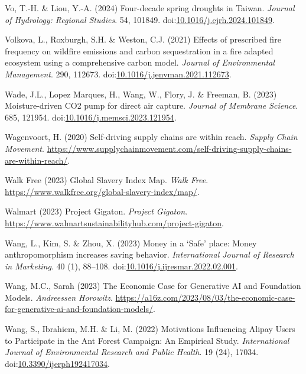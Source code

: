 \documentclass[
  letterpaper,
  DIV=11,
  numbers=noendperiod]{scrartcl}
\newlength{\cslhangindent}
\newenvironment{CSLReferences}[2] %
 {\begin{list}{}{%
  \setlength{\itemindent}{0pt}
  \setlength{\leftmargin}{0pt}
  \setlength{\parsep}{0pt}
  \ifodd #1
   \setlength{\leftmargin}{\cslhangindent}
   \setlength{\itemindent}{-1\cslhangindent}
  \fi
  \setlength{\itemsep}{#2\baselineskip}}}
 {\end{list}}
\begin{document}
\begin{CSLReferences}{0}{1}
Vo, T.-H. \& Liou, Y.-A. (2024) Four-decade spring droughts in {Taiwan}.
\emph{Journal of Hydrology: Regional Studies}. 54, 101849.
doi:\href{https://doi.org/10.1016/j.ejrh.2024.101849}{10.1016/j.ejrh.2024.101849}.

Volkova, L., Roxburgh, S.H. \& Weston, C.J. (2021) Effects of prescribed
fire frequency on wildfire emissions and carbon sequestration in a fire
adapted ecosystem using a comprehensive carbon model. \emph{Journal of
Environmental Management}. 290, 112673.
doi:\href{https://doi.org/10.1016/j.jenvman.2021.112673}{10.1016/j.jenvman.2021.112673}.

Wade, J.L., Lopez Marques, H., Wang, W., Flory, J. \& Freeman, B. (2023)
Moisture-driven {CO2} pump for direct air capture. \emph{Journal of
Membrane Science}. 685, 121954.
doi:\href{https://doi.org/10.1016/j.memsci.2023.121954}{10.1016/j.memsci.2023.121954}.

Wagenvoort, H. (2020) Self-driving supply chains are within reach.
\emph{Supply Chain Movement}.
\url{https://www.supplychainmovement.com/self-driving-supply-chains-are-within-reach/}.

Walk Free (2023) Global {Slavery Index Map}. \emph{Walk Free}.
\url{https://www.walkfree.org/global-slavery-index/map/}.

Walmart (2023) {Project Gigaton}. \emph{Project Gigaton}.
\url{https://www.walmartsustainabilityhub.com/project-gigaton}.

Wang, L., Kim, S. \& Zhou, X. (2023) Money in a {`{Safe}'} place:
{Money} anthropomorphism increases saving behavior. \emph{International
Journal of Research in Marketing}. 40 (1), 88--108.
doi:\href{https://doi.org/10.1016/j.ijresmar.2022.02.001}{10.1016/j.ijresmar.2022.02.001}.

Wang, M.C., Sarah (2023) The {Economic Case} for {Generative AI} and
{Foundation Models}. \emph{Andreessen Horowitz}.
\url{https://a16z.com/2023/08/03/the-economic-case-for-generative-ai-and-foundation-models/}.

Wang, S., Ibrahiem, M.H. \& Li, M. (2022) Motivations {Influencing
Alipay Users} to {Participate} in the {Ant Forest Campaign}: {An
Empirical Study}. \emph{International Journal of Environmental Research
and Public Health}. 19 (24), 17034.
doi:\href{https://doi.org/10.3390/ijerph192417034}{10.3390/ijerph192417034}.


\end{CSLReferences}
\end{document}

